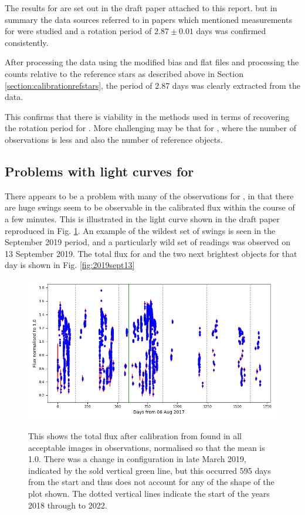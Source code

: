 The results for {\ross} are set out in the draft paper attached to this report.
but in summary the data sources referred to in papers which mentioned
measurements for {\ross} were studied and a rotation period of $2.87 \pm 0.01$
days was confirmed consistently.

After processing the data using the modified bias and flat files and processing
the counts relative to the reference stars as described above in Section
\ref{section:calibrationrefstars}, the period of 2.87 days was clearly extracted
from the data.

This confirms that there is viability in the methods used in terms of recovering
the rotation period for \ross. More challenging may be that for \bstar, where
the number of observations is less and also the number of reference objects.

\subsection{Problems with light curves for \ross}
\protect\label{secion:rossprobs}

There appears to be a problem with many of the observations for \ross, in that
there are huge swings seem to be observable in the calibrated flux within the course of a
few minutes. This is illustrated in the light curve shown in the draft paper
reproduced in Fig. \ref{fig:rossallcurve}. An example of the wildest set of
swings is seen in the September 2019 period, and a particularly wild set of
readings was observed on 13 September 2019. The total flux for {\ross} and the
two next brightest objects for that day is shown in Fig. \ref{fig:2019sept13}

\begin{figure}[!htbp]
\begin{center}
\includegraphics[scale=0.40]{images/remrossallcurve.png} \\
\vspace{-.5cm}
\end{center}
\caption{This shows the total flux after calibration from {\ross}
found in all acceptable images in {\rem}
observations, normalised so that the mean is 1.0. There was a change in
configuration in late March 2019, indicated by the sold vertical green line, but
this occurred 595 days from the start and thus does
not account for any of the shape of the plot
shown. The dotted vertical lines indicate the
start of the years 2018 through to 2022.}\protect\label{fig:rossallcurve}
\end{figure}

